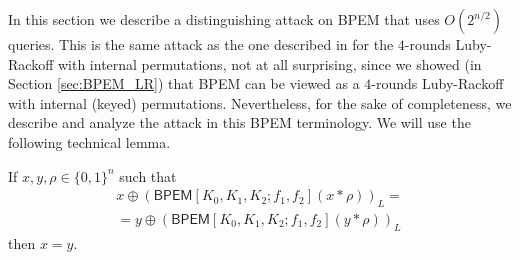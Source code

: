 \documentclass{llncs}
\newcommand{\s}{\{0,1\}}
\newcommand{\tx}{\textsf}
\begin{document}
In this section we describe a distinguishing attack on BPEM that uses $O(2^{n/2})$ queries. This is the same attack as the one described in 
\cite[Section 3.2]{TP} for the $4$-rounds Luby-Rackoff with internal permutations, not at all surprising, since we showed (in Section \ref{sec:BPEM_LR}) that BPEM can be viewed as a $4$-rounds Luby-Rackoff with internal (keyed) permutations. Nevertheless, for the sake of completeness, we describe and analyze the attack in this BPEM terminology.
We will use the following technical lemma.
\begin{lemma}\label{attack_lemma}
If $x,y,\rho\in\s^n$ such that
\begin{gather}\label{attack_lemma_given}
x\oplus\left(\tx{BPEM}[K_0,K_1, K_2; f_1, f_2](x*\rho)\right)_L=\nonumber\\
=y\oplus\left(\tx{BPEM}[K_0,K_1, K_2; f_1, f_2](y*\rho)\right)_L
\end{gather}
then $x=y$.
\end{lemma}
\end{document}
